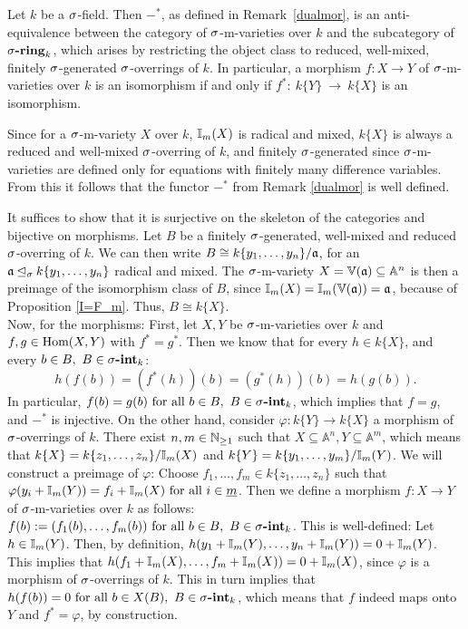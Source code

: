 \begin{prop}\label{dualisequiv}
Let $k$ be a $\sigma$-field. Then $-^*$, as defined in Remark~\ref{dualmor}, is an anti-equivalence between the category of $\sigma$-m-varieties over $k$ and the subcategory of $\sigma\text{{\normalfont\textbf{-ring}}}_k$, which arises by restricting the object class to reduced, well-mixed, finitely $\sigma$-generated $\sigma$-overrings of $k$. 
In particular, a morphism $f: X \rightarrow Y$ of $\sigma$-m-varieties over $k$ is an isomorphism if and only if $f^*:~k\{Y\}~\rightarrow~k\{X\}$ is an isomorphism.
\begin{bew}
Since for a $\sigma$-m-variety $X$ over $k$, $\mathbb{I}_m(X)$ is radical and mixed, $k\{X\}$ is always a reduced and well-mixed $\sigma$-overring of $k$, 
and finitely $\sigma$-generated since $\sigma$-m-varieties are defined only for equations with finitely many difference variables. From this it follows that the functor $-^*$ from Remark \ref{dualmor} is well defined. 

It suffices to show that it is surjective on the skeleton of the categories and bijective on morphisms. 
Let $B$ be a finitely $\sigma$-generated, well-mixed and reduced $\sigma$-overring of $k$. We can then write $B \cong k\{y_1,\ldots,y_n\}/\mathfrak{a}$, for an $\mathfrak{a} \unlhd_{\sigma} k\{y_1,\ldots,y_n\}$ radical and mixed. The $\sigma$-m-variety $X = \mathbb{V}(\mathfrak{a}) \subseteq \mathbb{A}^n$
is then a preimage of the isomorphism class of $B$, since $\mathbb{I}_m(X) = \mathbb{I}_m(\mathbb{V}(\mathfrak{a})) = \mathfrak{a}$, because of Proposition \ref{I=F_m}. Thus, $B \cong k\{X\}$. \\
\indent Now, for the morphisms: First, let $X,Y$ be $\sigma$-m-varieties over $k$ and $f,g \in \text{Hom}(X,Y)$ with $f^* = g^*$. Then we know that for every $h \in k\{X\}$, and every $b \in B, ~ B \in \sigma\text{{\normalfont\textbf{-int}}}_k$:
\[ h(f(b)) = (f^*(h))(b) = (g^*(h))(b) = h(g(b)). \]
In particular, $f(b) = g(b) \text{ for all } b \in B, ~ B \in \sigma\text{{\normalfont\textbf{-int}}}_k$, which implies that $f = g$, and $-^*$ is injective. 
On the other hand, consider $\varphi: k\{Y\} \rightarrow k\{X\}$ a morphism of $\sigma$-overrings of $k$. There exist $n,m \in \mathbb{N}_{\geq1}$ such that $X \subseteq \mathbb{A}^n, Y \subseteq \mathbb{A}^m$,
 which means that $k\{X\} = k\{z_1,\ldots,z_n\}/\mathbb{I}_m(X)$ and $k\{Y\} = k\{y_1,\ldots,y_m\}/\mathbb{I}_m(Y)$. We will construct a preimage of $\varphi$: Choose $f_1,\ldots,f_m \in k\{z_1,\ldots,z_n\}$ such that $\varphi(y_i + \mathbb{I}_m(Y)) = f_i + \mathbb{I}_m(X) \text{ for all } i \in \underline{m}$.
Then we define a morphism $f: X \rightarrow Y$ of $\sigma$-m-varieties over $k$ as follows: $f(b) := (f_1(b),\ldots,f_m(b)) \text{ for all } b \in B, ~ B \in \sigma\text{{\normalfont\textbf{-int}}}_k$. This is well-defined: Let $h \in \mathbb{I}_m(Y)$. Then, by definition, $h(y_1 + \mathbb{I}_m(Y),\ldots,y_n + \mathbb{I}_m(Y)) = 0 + \mathbb{I}_m(Y)$.
This implies that $h(f_1 + \mathbb{I}_m(X),\ldots,f_m + \mathbb{I}_m(X)) = 0 + \mathbb{I}_m(X)$, since $\varphi$ is a morphism of $\sigma$-overrings of $k$. This in turn implies that $h(f(b)) = 0 \text{ for all } b \in X(B), ~ B \in \sigma\text{{\normalfont\textbf{-int}}}_k$, which means that $f$ indeed maps onto $Y$ and $f^* = \varphi$, by construction.
\end{bew}
\end{prop}

